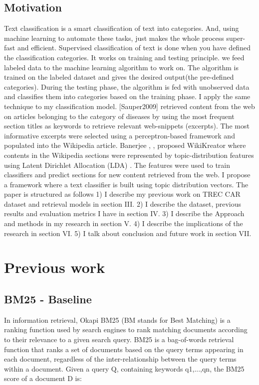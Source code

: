 \documentclass[conference]{IEEEtran}
\begin{document}
\subsection*{Motivation}
Text classification is a smart classification of text into categories. And, using machine learning to automate
these tasks, just makes the whole process super-fast and efficient. Supervised classification of text is done when
you have defined the classification categories. It works on training and testing principle. we feed labeled data
to the machine learning algorithm to work on. The algorithm is trained on the labeled dataset and gives the
desired output(the pre-defined categories). During the testing phase, the algorithm is fed with unobserved data
and classifies them into categories based on the training phase. I apply the same technique to my classification
model. [Sauper2009] \cite{c1} retrieved content from the web on articles belonging
to the category of diseases by using the most frequent section titles as keywords to retrieve relevant web-snippets
(excerpts). The most informative excerpts were selected using a perceptron-based framework and populated into
the Wikipedia article. Banerjee \cite{c2},  \cite{c3},  \cite{c4} proposed WikiKreator where contents
in the Wikipedia sections were represented by topic-distribution features using Latent Dirichlet Allocation (LDA)
\cite{c5}. The features were used to train classifiers and predict sections for new content retrieved from the
web. I propose a framework where a text classifier is built using topic distribution vectors. 
The paper is structured as follows 1) I describe my previous work on TREC CAR dataset \cite{c6} and retrieval models in section III. 2) I describe the dataset, previous results and evaluation metrics I have in section IV. 3) I describe the Approach and methods in my research in section V. 4) I describe the implications of the research in section VI. 5) I talk about conclusion and future work in section VII. 


\section*{Previous work} 
\subsection*{BM25 - Baseline} 
 In information retrieval, Okapi BM25 (BM stands for Best Matching) is a ranking function used by search engines to rank matching documents according to their relevance to a given search query. \cite{c7} BM25 is a bag-of-words retrieval function that ranks a set of documents based on the query terms appearing in each document, regardless of the inter-relationship between the query terms within a document. 
Given a query Q, containing keywords q1,...,qn, the BM25 score of a document D is:
\end{document}
